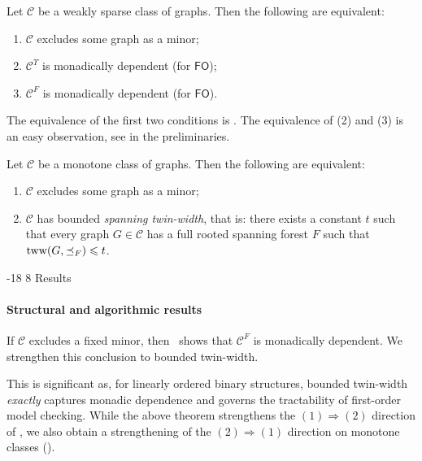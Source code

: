 \documentclass[1p,number,11pt]{elsarticle}
\makeatletter
\renewcommand\subsection{\@startsection{subsection}{2}{\z@}%
  {-18\p@ \@plus -4\p@ \@minus -4\p@}%
  {8\p@ \@plus 4\p@ \@minus 4\p@}%
  {\normalfont\normalsize\bfseries}}
\theoremstyle{plain}
\newcommand{\Cc}{\mathscr{C}}
\renewcommand{\FO}{\ensuremath{\mathsf{FO}}}
\renewcommand{\leq}{\leqslant}
\makeatother
\begin{document}
\begin{theorem}[note={\cite[Theorem~1.4]{buffiere2026characterizations}},store=thm:minor-tows]
Let $\Cc$ be a weakly sparse class of graphs. Then the following are equivalent:
\begin{enumerate}[label=(\arabic*),nosep]
  \item $\Cc$ excludes some graph as a minor;
  \item $\Cc^{\Upsilon}$ is monadically dependent (for \FO);
  \item $\Cc^F$ is monadically dependent (for \FO).
\end{enumerate}
\end{theorem}

The equivalence of the first two conditions is \cite[Theorem~1.4]{buffiere2026characterizations}.
The equivalence of (2) and (3) is an easy observation, see  in the preliminaries. 

\begin{theorem}[note={\cite[Theorem~2]{bonnet2022twin}},store=thm:minor-tww]
Let $\Cc$ be a monotone class of graphs. Then the following are equivalent:
\begin{enumerate}[label=(\arabic*),nosep]
  \item $\Cc$ excludes some graph as a minor;
  \item $\Cc$ has bounded \emph{spanning twin-width}, that is: there exists a constant $t$ such that every graph $G\in\Cc$ has a full rooted spanning forest $F$ such that ${\rm tww}(G,\preceq_F)\leq t$.
\end{enumerate}
\end{theorem}


\subsection{Results}

\paragraph{Structural and algorithmic results}
If $\Cc$ excludes a fixed minor, then~ shows that $\Cc^F$ is monadically dependent.
We strengthen this conclusion to bounded twin-width.


This is significant as, for linearly ordered binary structures, bounded twin-width \textsl{exactly} captures monadic dependence and governs the tractability of first-order model checking.
While the above theorem strengthens the $(1) \Rightarrow (2)$ direction of , we also obtain a strengthening of the $(2) \Rightarrow (1)$ direction on monotone classes ().
\end{document}
